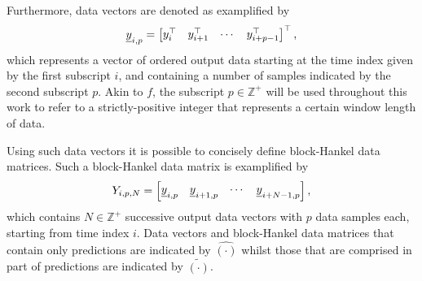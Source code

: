 Furthermore, data vectors are denoted as examplified by
\begin{align*}
    \underline{y}_{i,p} = \begin{bmatrix} y_i^\top & y_{i+1}^\top & \cdots & y_{i+p-1}^\top\end{bmatrix}^\top,
\end{align*}
which represents a vector of ordered output data starting at the time index given by the first subscript $i$, and containing a number of samples indicated by the second subscript $p$. Akin to $f$, the subscript $p\in\mathbb{Z}^+$ will be used throughout this work to refer to a strictly-positive integer that represents a certain window length of data.

Using such data vectors it is possible to concisely define block-Hankel data matrices. Such a block-Hankel data matrix is examplified by
\begin{align*}
    Y_{i,p,N} = \begin{bmatrix}
        \underline{y}_{i,p} & \underline{y}_{i+1,p} & \cdots & \underline{y}_{i+N-1,p}
    \end{bmatrix},
\end{align*}
which contains $N\in\mathbb{Z}^+$ successive output data vectors with $p$ data samples each, starting from time index $i$. Data vectors and block-Hankel data matrices that contain only predictions are indicated by $\hat{(\cdot)}$ whilst those that are comprised in part of predictions are indicated by $\tilde{(\cdot)}$.